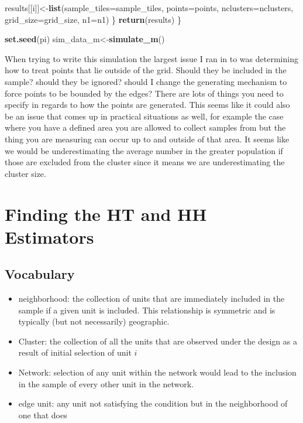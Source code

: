 \documentclass[
]{article}
\newenvironment{Shaded}{\begin{snugshade}}{\end{snugshade}}
\newcommand{\AttributeTok}[1]{\textcolor[rgb]{0.13,0.29,0.53}{#1}}
\newcommand{\FunctionTok}[1]{\textcolor[rgb]{0.13,0.29,0.53}{\textbf{#1}}}
\newcommand{\NormalTok}[1]{#1}
\newcommand{\OtherTok}[1]{\textcolor[rgb]{0.56,0.35,0.01}{#1}}
\providecommand{\tightlist}{%
  \setlength{\itemsep}{0pt}\setlength{\parskip}{0pt}}
\begin{document}
\begin{Shaded}
\begin{Highlighting}[]
\NormalTok{    results[[i]]}\OtherTok{\textless{}{-}}\FunctionTok{list}\NormalTok{(}\AttributeTok{sample\_tiles=}\NormalTok{sample\_tiles,}
                                  \AttributeTok{points=}\NormalTok{points,}
                                  \AttributeTok{nclusters=}\NormalTok{nclusters,}
                                  \AttributeTok{grid\_size=}\NormalTok{grid\_size,}
                                  \AttributeTok{n1=}\NormalTok{n1)}
\NormalTok{  \}}
  \FunctionTok{return}\NormalTok{(results)}
\NormalTok{\}}

\FunctionTok{set.seed}\NormalTok{(pi)}
\NormalTok{sim\_data\_m}\OtherTok{\textless{}{-}}\FunctionTok{simulate\_m}\NormalTok{()}
\end{Highlighting}
\end{Shaded}

When trying to write this simulation the largest issue I ran in to was
determining how to treat points that lie outside of the grid. Should
they be included in the sample? should they be ignored? should I change
the generating mechanism to force points to be bounded by the edges?
There are lots of things you need to specify in regards to how the
points are generated. This seems like it could also be an issue that
comes up in practical situations as well, for example the case where you
have a defined area you are allowed to collect samples from but the
thing you are measuring can occur up to and outside of that area. It
seems like we would be underestimating the average number in the greater
population if those are excluded from the cluster since it means we are
underestimating the cluster size.

\section{Finding the HT and HH
Estimators}\label{finding-the-ht-and-hh-estimators}

\subsection{Vocabulary}\label{vocabulary}

\begin{itemize}
\tightlist
\item
  neighborhood: the collection of units that are immediately included in
  the sample if a given unit is included. This relationship is symmetric
  and is typically (but not necessarily) geographic.
\item
  Cluster: the collection of all the units that are observed under the
  design as a result of initial selection of unit \(i\)
\item
  Network: selection of any unit within the network would lead to the
  inclusion in the sample of every other unit in the network.
\item
  edge unit: any unit not satisfying the condition but in the
  neighborhood of one that does
\end{itemize}
\end{document}
